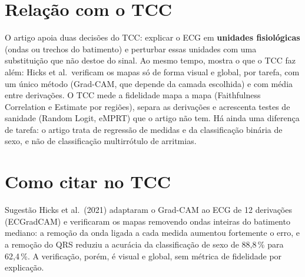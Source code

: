 \documentclass[11pt,a4paper]{article}
\begin{document}
\section{Relação com o TCC}
O artigo apoia duas decisões do TCC: explicar o ECG em \textbf{unidades fisiológicas} (ondas ou trechos do batimento) e perturbar essas unidades com uma substituição que não destoe do sinal. Ao mesmo tempo, mostra o que o TCC faz além: Hicks et al.\ verificam os mapas só de forma visual e global, por tarefa, com um único método (Grad-CAM, que depende da camada escolhida) e com média entre derivações. O TCC mede a fidelidade mapa a mapa (Faithfulness Correlation e Estimate por regiões), separa as derivações e acrescenta testes de sanidade (Random Logit, eMPRT) que o artigo não tem. Há ainda uma diferença de tarefa: o artigo trata de regressão de medidas e da classificação binária de sexo, e não de classificação multirrótulo de arritmias.

\section{Como citar no TCC}
\begin{infobox}[ok]{Sugestão}
Hicks et al.\ (2021) adaptaram o Grad-CAM ao ECG de 12 derivações (ECGradCAM) e verificaram os mapas removendo ondas inteiras do batimento mediano: a remoção da onda ligada a cada medida aumentou fortemente o erro, e a remoção do QRS reduziu a acurácia da classificação de sexo de 88,8\,\% para 62,4\,\%. A verificação, porém, é visual e global, sem métrica de fidelidade por explicação.
\end{infobox}
\end{document}
